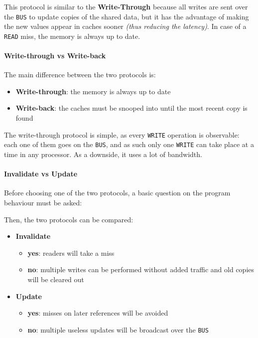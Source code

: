 \documentclass[english]{article}
\begin{document}
This protocol is similar to the \textbf{Write-Through} because all writes are sent over the \texttt{BUS} to update copies of the shared data, but it has the advantage of making the new values appear in caches sooner \textit{(thus reducing the latency)}.
In case of a \texttt{READ} miss, the memory is always up to date.

\paragraph{Write-through vs Write-back}

The main difference between the two protocols is:

\begin{itemize}
  \item \textbf{Write-through}: the memory is always up to date
  \item \textbf{Write-back}: the caches must be snooped into until the most recent copy is found
\end{itemize}

The write-through protocol is simple, as every \texttt{WRITE} operation is observable:
each one of them goes on the \texttt{BUS}, and as such only one \texttt{WRITE} can take place at a time in any processor.
As a downside, it uses a lot of bandwidth.

\paragraph{Invalidate vs Update}

Before choosing one of the two protocols, a basic question on the program behaviour must be asked:


Then, the two protocols can be compared:

\begin{itemize}
  \item \textbf{Invalidate}
        \begin{itemize}
          \item[\cmarkthin] \textbf{yes}: readers will take a miss
          \item[\xmarkthin] \textbf{no}: multiple writes can be performed without added traffic and old copies will be cleared out
        \end{itemize}
  \item \textbf{Update}
        \begin{itemize}
          \item[\cmarkthin] \textbf{yes}: misses on later references will be avoided
          \item[\xmarkthin] \textbf{no}: multiple useless updates will be broadcast over the \texttt{BUS}
        \end{itemize}
\end{itemize}
\end{document}
